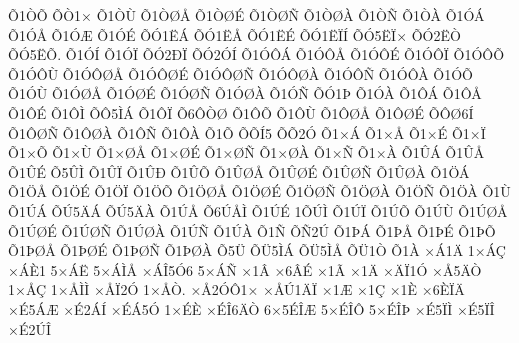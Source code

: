 {^^d51^^d2^^d5
^^d5^^d21^^d7
^^d51^^d2^^d9
^^d51^^d2^^d8^^c5
^^d51^^d2^^d8^^c9
^^d51^^d2^^d8^^d1
^^d51^^d2^^d8^^c0
^^d51^^d2^^d1
^^d51^^d2^^c0
^^d51^^d3^^c1
^^d51^^d3^^c5
^^d51^^d3^^c6
^^d51^^d3^^c9
^^d5^^d31^^cb^^c1
^^d5^^d31^^cb^^c5
^^d5^^d31^^cb^^c9
^^d5^^d31^^cb^^cf^^cd
^^d5^^d35^^cb^^cf^^d7
^^d5^^d32^^cb^^d2
^^d5^^d35^^cb^^d5.
^^d51^^d3^^cd
^^d51^^d3^^cf
^^d5^^d32^^d0^^cf
^^d5^^d32^^d3^^cd
^^d51^^d3^^d4^^c1
^^d51^^d3^^d4^^c5
^^d51^^d3^^d4^^c9
^^d51^^d3^^d4^^cf
^^d51^^d3^^d4^^d5
^^d51^^d3^^d4^^d9
^^d51^^d3^^d4^^d8^^c5
^^d51^^d3^^d4^^d8^^c9
^^d51^^d3^^d4^^d8^^d1
^^d51^^d3^^d4^^d8^^c0
^^d51^^d3^^d4^^d1
^^d51^^d3^^d4^^c0
^^d51^^d3^^d5
^^d51^^d3^^d9
^^d51^^d3^^d8^^c5
^^d51^^d3^^d8^^c9
^^d51^^d3^^d8^^d1
^^d51^^d3^^d8^^c0
^^d51^^d3^^d1
^^d5^^d31^^de
^^d51^^d3^^c0
^^d51^^d4^^c1
^^d51^^d4^^c5
^^d51^^d4^^c9
^^d51^^d4^^cc
^^d5^^d45^^cc^^c1
^^d51^^d4^^cf
^^d56^^d4^^d2^^d8
^^d51^^d4^^d5
^^d51^^d4^^d9
^^d51^^d4^^d8^^c5
^^d51^^d4^^d8^^c9
^^d5^^d4^^d86^^cd
^^d51^^d4^^d8^^d1
^^d51^^d4^^d8^^c0
^^d51^^d4^^d1
^^d51^^d4^^c0
^^d51^^d5
^^d5^^d5^^cd5
^^d5^^d52^^d3
^^d51^^d7^^c1
^^d51^^d7^^c5
^^d51^^d7^^c9
^^d51^^d7^^cf
^^d51^^d7^^d5
^^d51^^d7^^d9
^^d51^^d7^^d8^^c5
^^d51^^d7^^d8^^c9
^^d51^^d7^^d8^^d1
^^d51^^d7^^d8^^c0
^^d51^^d7^^d1
^^d51^^d7^^c0
^^d51^^db^^c1
^^d51^^db^^c5
^^d51^^db^^c9
^^d55^^db^^cc
^^d51^^db^^cf
^^d51^^db^^d0
^^d51^^db^^d5
^^d51^^db^^d8^^c5
^^d51^^db^^d8^^c9
^^d51^^db^^d8^^d1
^^d51^^db^^d8^^c0
^^d51^^d6^^c1
^^d51^^d6^^c5
^^d51^^d6^^c9
^^d51^^d6^^cf
^^d51^^d6^^d5
^^d51^^d6^^d8^^c5
^^d51^^d6^^d8^^c9
^^d51^^d6^^d8^^d1
^^d51^^d6^^d8^^c0
^^d51^^d6^^d1
^^d51^^d6^^c0
^^d51^^d9
^^d51^^da^^c1
^^d5^^da5^^c4^^c1
^^d5^^da5^^c4^^c0
^^d51^^da^^c5
^^d56^^da^^c5^^cc
^^d51^^da^^c9
1^^d5^^da^^cc
^^d51^^da^^cf
^^d51^^da^^d5
^^d51^^da^^d9
^^d51^^da^^d8^^c5
^^d51^^da^^d8^^c9
^^d51^^da^^d8^^d1
^^d51^^da^^d8^^c0
^^d51^^da^^d1
^^d51^^da^^c0
^^d51^^d1
^^d5^^d12^^da
^^d51^^de^^c1
^^d51^^de^^c5
^^d51^^de^^c9
^^d51^^de^^d5
^^d51^^de^^d8^^c5
^^d51^^de^^d8^^c9
^^d51^^de^^d8^^d1
^^d51^^de^^d8^^c0
^^d55^^dc
^^d5^^dc5^^cc^^c1
^^d5^^dc5^^cc^^c5
^^d5^^dc1^^d2
^^d51^^c0
^^d7^^c11^^c4
1^^d7^^c1^^c7
^^d7^^c1^^c81
5^^d7^^c1^^cb
5^^d7^^c1^^cc^^c5
^^d7^^c1^^ce5^^d36
5^^d7^^c1^^d1
^^d71^^c2
^^d76^^c2^^c9
^^d71^^c3
^^d71^^c4
^^d7^^c4^^cf1^^d3
^^d7^^c55^^c4^^d2
1^^d7^^c5^^c7
1^^d7^^c5^^cc^^cc
^^d7^^c5^^cf2^^d3
1^^d7^^c5^^d2.
^^d7^^c52^^d3^^d41^^d7
^^d7^^c5^^da1^^c4^^cf
^^d71^^c6
^^d71^^c7
^^d71^^c8
^^d76^^c8^^cf^^c4
^^d7^^c95^^c1^^c6
^^d7^^c92^^c1^^cd
^^d7^^c9^^c15^^d3
1^^d7^^c9^^c8
^^d7^^c9^^ce6^^c4^^d2
6^^d75^^c9^^ce^^c6
5^^d7^^c9^^ce^^d4
5^^d7^^c9^^ce^^de
^^d7^^c95^^cf^^cc
^^d7^^c95^^cf^^ce
^^d7^^c92^^da^^ce
}
